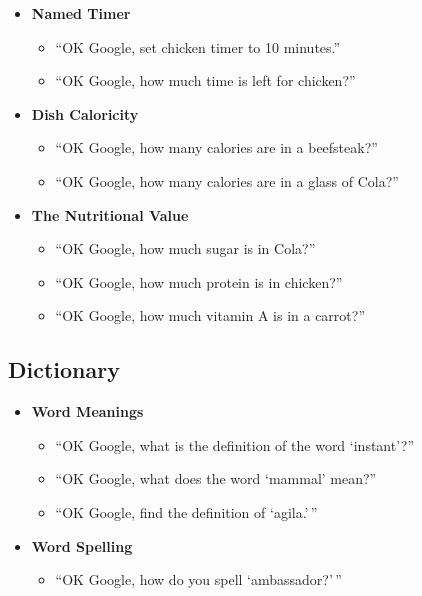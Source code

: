 \documentclass[
  jou,
  floatsintext,
  longtable,
  a4paper,
  nolmodern,
  notxfonts,
  notimes,
  colorlinks=true,linkcolor=blue,citecolor=blue,urlcolor=blue]{apa7}
\providecommand{\tightlist}{%
  \setlength{\itemsep}{0pt}\setlength{\parskip}{0pt}}
\begin{document}
\begin{itemize}
\tightlist
\item
  \textbf{Named Timer}

  \begin{itemize}
  \tightlist
  \item
    ``OK Google, set chicken timer to 10 minutes.''
  \item
    ``OK Google, how much time is left for chicken?''
  \end{itemize}
\item
  \textbf{Dish Caloricity}

  \begin{itemize}
  \tightlist
  \item
    ``OK Google, how many calories are in a beefsteak?''
  \item
    ``OK Google, how many calories are in a glass of Cola?''
  \end{itemize}
\item
  \textbf{The Nutritional Value}

  \begin{itemize}
  \tightlist
  \item
    ``OK Google, how much sugar is in Cola?''
  \item
    ``OK Google, how much protein is in chicken?''
  \item
    ``OK Google, how much vitamin A is in a carrot?''
  \end{itemize}
\end{itemize}

\subsection{Dictionary}\label{dictionary}

\begin{itemize}
\tightlist
\item
  \textbf{Word Meanings}

  \begin{itemize}
  \tightlist
  \item
    ``OK Google, what is the definition of the word `instant'?''
  \item
    ``OK Google, what does the word `mammal' mean?''
  \item
    ``OK Google, find the definition of `agila.'\,''
  \end{itemize}
\item
  \textbf{Word Spelling}

  \begin{itemize}
  \tightlist
  \item
    ``OK Google, how do you spell `ambassador?'\,''
  \end{itemize}
\end{itemize}
\end{document}
